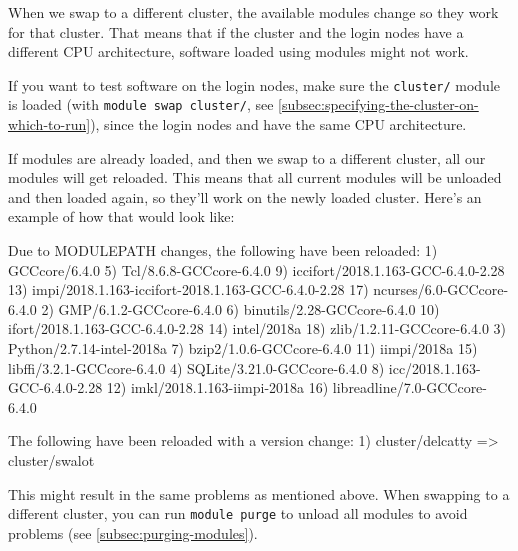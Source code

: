 When we swap to a different cluster, the available modules change so they work for that cluster.
That means that if the cluster and the login nodes have a different CPU architecture,
software loaded using modules might not work.

If you want to test software on the login nodes, make sure the \texttt{cluster/}
module is loaded (with \texttt{module swap cluster/}, see
\autoref{subsec:specifying-the-cluster-on-which-to-run}),
since the login nodes and  have the same CPU architecture.

If modules are already loaded, and then we swap to a different cluster,
all our modules will get reloaded. This means that all current modules will be
unloaded and then loaded again, so they'll work on the newly loaded cluster.
Here's an example of how that would look like:

\begin{prompt}

Due to MODULEPATH changes, the following have been reloaded:
  1) GCCcore/6.4.0                   5) Tcl/8.6.8-GCCcore-6.4.0           9) iccifort/2018.1.163-GCC-6.4.0-2.28    13) impi/2018.1.163-iccifort-2018.1.163-GCC-6.4.0-2.28    17) ncurses/6.0-GCCcore-6.4.0
  2) GMP/6.1.2-GCCcore-6.4.0         6) binutils/2.28-GCCcore-6.4.0      10) ifort/2018.1.163-GCC-6.4.0-2.28       14) intel/2018a                                           18) zlib/1.2.11-GCCcore-6.4.0
  3) Python/2.7.14-intel-2018a       7) bzip2/1.0.6-GCCcore-6.4.0        11) iimpi/2018a                           15) libffi/3.2.1-GCCcore-6.4.0
  4) SQLite/3.21.0-GCCcore-6.4.0     8) icc/2018.1.163-GCC-6.4.0-2.28    12) imkl/2018.1.163-iimpi-2018a           16) libreadline/7.0-GCCcore-6.4.0

The following have been reloaded with a version change:
  1) cluster/delcatty => cluster/swalot
\end{prompt}

This might result in the same problems as mentioned above. When swapping to a
different cluster, you can run \verb|module purge| to unload all modules to avoid problems
(see \autoref{subsec:purging-modules}).

\fi
